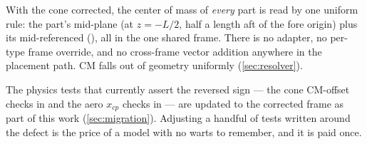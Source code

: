\begin{designrule}
With the cone corrected, the center of mass of \emph{every} part is read by one uniform rule:
the part's mid-plane (at $z = -L/2$, half a length aft of the fore origin) plus its mid-referenced
 (), all in the one shared frame. There
is no  adapter, no per-type frame override, and no cross-frame vector
addition anywhere in the placement path. CM falls out of geometry uniformly (\cref{sec:resolver}).
\end{designrule}

The physics tests that currently assert the reversed sign --- the cone CM-offset checks in
 and the aero $x_{cp}$ checks in
 --- are updated to the corrected frame as part of this work
(\cref{sec:migration}). Adjusting a handful of tests written around the defect is the price of a
model with no warts to remember, and it is paid once.
